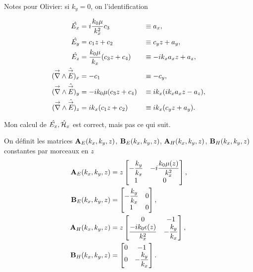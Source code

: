   {
  \begin{itshape}
  Notes pour Olivier: si \(k_y =0\), on l'identification

  \begin{align*}
  \hat{E_x} &= i\dfrac{k_0\mu}{k_x^2} c_3 &&\equiv a_x,
  \\
  \hat{E_y} &= c_1 z + c_2 && \equiv c_y z + a_y,
  \\
  \hat{E_z} &= \dfrac{k_0\mu}{k_x}(c_3 z + c_4) &&\equiv -i k_x a_x z + a_z,
  \\
  ({\overset{\rightarrow}{\nabla}}\wedge\hat{{\overset{\rightarrow}{E}}})_x &= -c_1 && \equiv  -c_y,
  \\
  ({\overset{\rightarrow}{\nabla}}\wedge\hat{{\overset{\rightarrow}{E}}})_y &= -i{k_0\mu}(c_3 z + c_4) &&\equiv ik_x(ik_x a_x z - a_z),
  \\
  ({\overset{\rightarrow}{\nabla}}\wedge\hat{{\overset{\rightarrow}{E}}})_z &= ik_x(c_1 z + c_2) && \equiv ik_x(c_y z + a_y).
  \end{align*}


  Mon calcul de \(\hat{E_x},\hat{\mathcal{H}}_x\) est correct, mais pas ce qui suit.

  \end{itshape}
  }

  On définit les matrices \(\mathbf{A}_{E}(k_x,k_y,z)\), \(\mathbf{B}_{E}(k_x,k_y,z)\), \(\mathbf{A}_{H}(k_x,k_y,z)\), \(\mathbf{B}_{H}(k_x,k_y,z)\) constantes par morceaux en \(z\)
  \begin{align*}
    \mathbf{A}_{E}(k_x,k_y,z) &= z
    \begin{bmatrix}
      -\dfrac{k_y}{k_x} & -i\dfrac{k_0\mu(z)}{k_x^2}
      \\
      1 & 0
    \end{bmatrix},
    \\
    \mathbf{B}_{E}(k_x,k_y,z) &= 
    \begin{bmatrix}
      -\dfrac{k_y}{k_x} & 0
      \\
      1 & 0
    \end{bmatrix},
    \\
    \mathbf{A}_{H}(k_x,k_y,z) &= z
    \begin{bmatrix}
      0 & -1
      \\
      \dfrac{-ik_0\epsilon(z)}{k_x^2} & -\dfrac{k_y}{k_x}
    \end{bmatrix},
    \\
    \mathbf{B}_{H}(k_x,k_y,z) &= 
    \begin{bmatrix}
      0 & -1
      \\
      0 & -\dfrac{k_y}{k_x}
    \end{bmatrix}.
  \end{align*}

